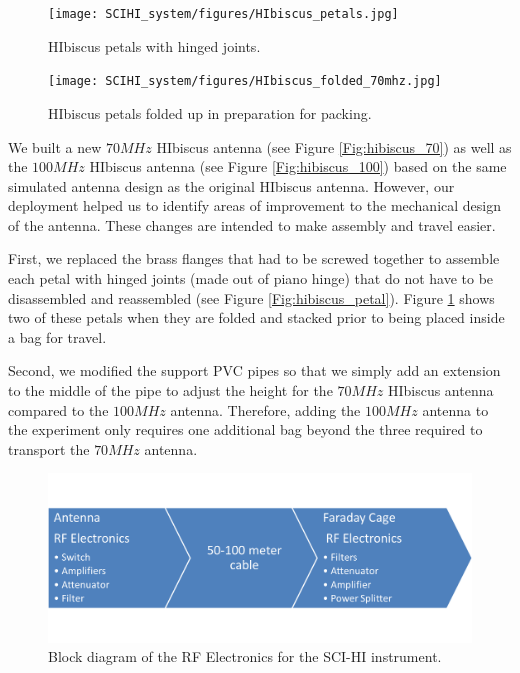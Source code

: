 \begin{figure}[htb]
\centering
\begin{minipage}[b]{0.33\textwidth}
\centering
\texttt{[image: SCIHI\_system/figures/HIbiscus\_petals.jpg]}
\caption{HIbiscus petals with hinged joints.}
\label{Fig:hibiscus_petal}
\end{minipage}%
\begin{minipage}[b]{0.02\textwidth}
\hspace{1cm}
\end{minipage}%
\begin{minipage}[b]{0.61\textwidth}
\centering
\texttt{[image: SCIHI\_system/figures/HIbiscus\_folded\_70mhz.jpg]}
\caption{HIbiscus petals folded up in preparation for packing.}
\label{Fig:hibiscus_fold}
\end{minipage}
\end{figure}

We built a new $70 MHz$ HIbiscus antenna (see Figure \ref{Fig:hibiscus_70}) as well as the $100 MHz$ HIbiscus antenna (see Figure \ref{Fig:hibiscus_100}) based on the same simulated antenna design as the original HIbiscus antenna. However, our deployment helped us to identify areas of improvement to the mechanical design of the antenna. These changes are intended to make assembly and travel easier. 

First, we replaced the brass flanges that had to be screwed together to assemble each petal with hinged joints (made out of piano hinge) that do not have to be disassembled and reassembled (see Figure \ref{Fig:hibiscus_petal}). Figure \ref{Fig:hibiscus_fold} shows two of these petals when they are folded and stacked prior to being placed inside a bag for travel. 

Second, we modified the support PVC pipes so that we simply add an extension to the middle of the pipe to adjust the height for the $70 MHz$ HIbiscus antenna compared to the $100 MHz$ antenna. Therefore, adding the $100 MHz$ antenna to the experiment only requires one additional bag beyond the three required to transport the $70 MHz$ antenna. 

\begin{figure}[htb]
\begin{center}
\includegraphics[width=0.9\linewidth]{SCIHI_system/figures/rf_electronics_block_diagram.png}
\caption{Block diagram of the RF Electronics for the SCI-HI instrument.}
\label{Fig:RF_block_diagram}
\end{center}
\end{figure}


